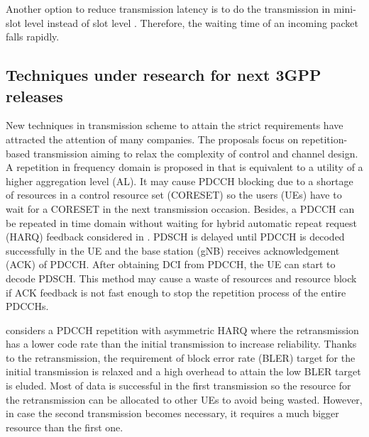 \documentclass[conference,10pt]{IEEEtran}
\begin{document}
Another option to reduce transmission latency is to do the transmission in mini-slot level instead of slot level \cite{ad3}. Therefore, the waiting time of an incoming packet falls rapidly.

\subsection{Techniques under research for next 3GPP releases}\label{IBB}
New techniques in transmission scheme to attain the strict requirements have attracted the attention of many companies. The proposals focus on repetition-based transmission aiming to relax the complexity of control and channel design. A repetition in frequency domain is proposed in \cite{b1} that is equivalent to a utility of a higher aggregation level (AL). It may cause PDCCH blocking due to a shortage of resources in a control resource set (CORESET) so the users (UEs) have to wait for a CORESET in the next transmission occasion. Besides, a PDCCH can be repeated in time domain without waiting for hybrid automatic repeat request (HARQ) feedback considered in \cite{b2}. PDSCH is delayed until PDCCH is decoded successfully in the UE and the base station (gNB) receives acknowledgement (ACK) of PDCCH. After obtaining DCI from PDCCH, the UE can start to decode PDSCH. This method may cause a waste of resources and resource block if ACK feedback is not fast enough to stop the repetition process of the entire PDCCHs. 

\cite{b3} considers a PDCCH repetition with asymmetric HARQ where the retransmission has a lower code rate than the initial transmission to increase reliability. Thanks to the retransmission, the requirement of block error rate (BLER) target for the initial transmission is relaxed and a high overhead to attain the low BLER target is eluded. Most of data is successful in the first transmission so the resource for the retransmission can be allocated to other UEs to avoid being wasted. However, in case the second transmission becomes necessary, it requires a much bigger resource than the first one.
\end{document}
